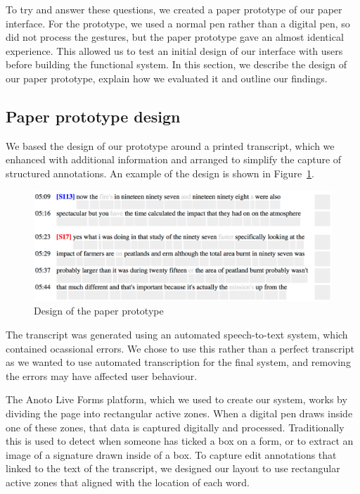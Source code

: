 To try and answer these questions, we created a paper prototype of our paper interface. For the prototype, we used a
normal pen rather than a digital pen, so did not process the gestures, but the paper prototype gave an almost identical
experience. This allowed us to test an initial design of our interface with users before building the functional
system.  In this section, we describe the design of our paper prototype, explain how we evaluated it and outline our
findings.

\subsection{Paper prototype design}

We based the design of our prototype around a printed transcript, which we enhanced with additional information and
arranged to simplify the capture of structured annotations. An example of the design is shown in
Figure~\ref{fig:paper-prototype-design}.

\begin{figure}[h]
  \centering
  \includegraphics[width=\columnwidth]{figs/paper-prototype-design}
  \caption{Design of the paper prototype}
  \label{fig:paper-prototype-design}
\end{figure}

The transcript was generated using an automated speech-to-text system, which contained ocassional errors. We chose to
use this rather than a perfect transcript as we wanted to use automated transcription for the final system, and
removing the errors may have affected user behaviour.

The Anoto Live Forms platform, which we used to create our system, works by dividing the page into rectangular active
zones.  When a digital pen draws inside one of these zones, that data is captured digitally and processed.
Traditionally this is used to detect when someone has ticked a box on a form, or to extract an image of a signature
drawn inside of a box.  To capture edit annotations that linked to the text of the transcript, we designed our layout
to use rectangular active zones that aligned with the location of each word.

